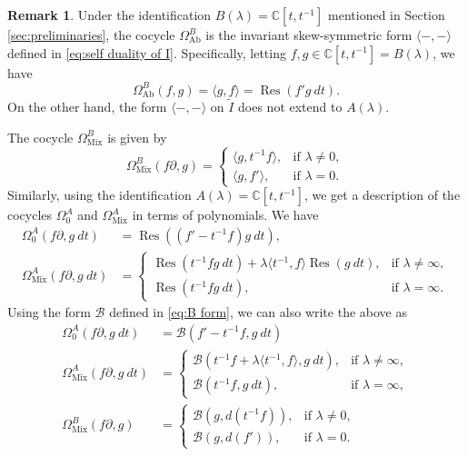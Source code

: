 \documentclass[11pt, svgnames]{amsart}
\DeclareMathOperator{\Res}{Res}
\newcommand{\CC}{\mathbb{C}}
\newcommand{\del}{\partial}
\DeclareMathOperator{\Ab}{Ab}
\DeclareMathOperator{\Mix}{Mix}
\newcommand{\ang}[1]{\langle #1 \rangle}
\theoremstyle{definition}
\newtheorem{remark}[proposition]{Remark}
\begin{document}
\begin{remark}\label{rem:basis-free cocycles}
    Under the identification $B(\lambda) = \CC[t,t^{-1}]$ mentioned in Section \ref{sec:preliminaries}, the cocycle $\Omega_{\Ab}^B$ is the invariant skew-symmetric form $\ang{-,-}$ defined in \eqref{eq:self duality of I}. Specifically, letting $f,g \in \CC[t,t^{-1}] = B(\lambda)$, we have
    $$\Omega_{\Ab}^B(f,g) = \ang{g,f} = \Res(f'g \ dt).$$
    On the other hand, the form $\ang{-,-}$ on $\widetilde{I}$ does not extend to $A(\lambda)$.

    The cocycle $\Omega_{\Mix}^B$ is given by
    $$\Omega_{\Mix}^B(f\del,g) = \begin{cases}
        \ang{g,t^{-1}f}, &\text{if } \lambda \neq 0, \\
        \ang{g,f'}, &\text{if } \lambda = 0.
    \end{cases}$$
    Similarly, using the identification $A(\lambda) = \CC[t,t^{-1}]$, we get a description of the cocycles $\Omega_0^A$ and $\Omega_{\Mix}^A$ in terms of polynomials. We have
    \begin{align*}
        \Omega_0^A(f\del, g \ dt) &= \Res((f' - t^{-1}f)g \ dt), \\
        \Omega_{\Mix}^A(f\del, g \ dt) &= \begin{cases}
            \Res(t^{-1}fg \ dt) + \lambda \ang{t^{-1},f}\Res(g \ dt), &\text{if } \lambda \neq \infty, \\
            \Res(t^{-1}fg \ dt), &\text{if } \lambda = \infty.
        \end{cases}
    \end{align*}
    Using the form $\mathcal{B}$ defined in \eqref{eq:B form}, we can also write the above as
    \begin{align*}
        \Omega_0^A(f\del,g \ dt) &= \mathcal{B}(f' - t^{-1}f, g \ dt) \\
        \Omega_{\Mix}^A(f\del, g \ dt) &= \begin{cases}
            \mathcal{B}(t^{-1}f + \lambda \ang{t^{-1},f}, g \ dt), &\text{if } \lambda \neq \infty, \\
            \mathcal{B}(t^{-1}f, g \ dt), &\text{if } \lambda = \infty,
        \end{cases} \\
        \Omega_{\Mix}^B(f\del, g) &= \begin{cases}
            \mathcal{B}(g, d(t^{-1}f)), &\text{if } \lambda \neq 0, \\
            \mathcal{B}(g, d(f')), &\text{if } \lambda = 0.
        \end{cases}
    \end{align*}
\end{remark}
\end{document}
